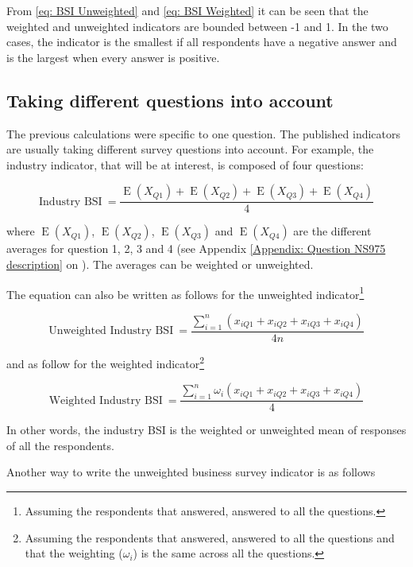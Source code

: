 \documentclass[12pt,a4paper,oneside]{book}
\DeclareMathOperator{\E}{E}
\begin{document}
From \autoref{eq: BSI Unweighted} and \ref{eq: BSI Weighted} it can be seen that the weighted and unweighted indicators are bounded between -1 and 1. In the two cases, the indicator is the smallest if all respondents have a negative answer and is the largest when every answer is positive.

\subsection{Taking different questions into account}

The previous calculations were specific to one question. The published indicators are usually taking different survey questions into account. For example, the industry indicator, that will be at interest, is composed of four questions:

\begin{equation}
    \mbox{Industry BSI}\ = \frac{\E(X_{Q1}) + \E(X_{Q2}) + \E(X_{Q3}) + \E(X_{Q4})}{4}
\end{equation}

where 
$\E(X_{Q1})$, $\E(X_{Q2})$, $\E(X_{Q3})$ and $\E(X_{Q4})$ are the different averages for question 1, 2, 3 and 4 (see Appendix \autoref{Appendix: Question NS975 description} on ). The averages can be weighted or unweighted.

The equation can also be written as follows for the unweighted indicator\footnote{Assuming the respondents that answered, answered to all the questions.}

\begin{equation}
    \mbox{Unweighted Industry BSI}\ = \frac{\sum^n_{i=1}(x_{iQ1} + x_{iQ2} + x_{iQ3} + x_{iQ4})}{4n} 
\end{equation} 

and as follow for the weighted indicator\footnote{Assuming the respondents that answered, answered to all the questions and that the weighting ($\omega_i$) is the same across all the questions.}

\begin{equation}
    \mbox{Weighted Industry BSI}\ = \frac{\sum^n_{i=1} \omega_i (x_{iQ1} + x_{iQ2} + x_{iQ3} + x_{iQ4})}{4} 
\end{equation} 

In other words, the industry BSI is the weighted or unweighted mean of responses of all the respondents.

Another way to write the unweighted business survey indicator is as follows
\end{document}
